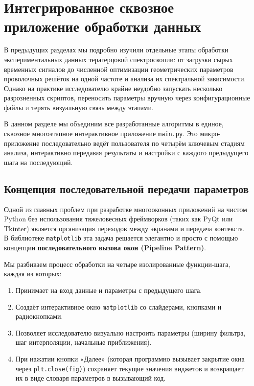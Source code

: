 
\section{Интегрированное сквозное приложение обработки данных} \label{sec:integrated_app}

В предыдущих разделах мы подробно изучили отдельные этапы обработки экспериментальных данных терагерцовой спектроскопии: от загрузки сырых временных сигналов до численной оптимизации геометрических параметров проволочных решёток на одной частоте и анализа их спектральной зависимости. Однако на практике исследователю крайне неудобно запускать несколько разрозненных скриптов, переносить параметры вручную через конфигурационные файлы и терять визуальную связь между этапами.

В данном разделе мы объединим все разработанные алгоритмы в единое, сквозное многоэтапное интерактивное приложение \texttt{main.py}. Это микро-приложение последовательно ведёт пользователя по четырём ключевым стадиям анализа, интерактивно передавая результаты и настройки с каждого предыдущего шага на последующий.

\subsection{Концепция последовательной передачи параметров}

Одной из главных проблем при разработке многооконных приложений на чистом Python без использования тяжеловесных фреймворков (таких как PyQt или Tkinter) является организация переходов между экранами и передача контекста. В библиотеке \texttt{matplotlib} эта задача решается элегантно и просто с помощью концепции \textbf{последовательного вызова окон (Pipeline Pattern)}.

Мы разбиваем процесс обработки на четыре изолированные функции-шага, каждая из которых:
\begin{enumerate}
    \item Принимает на вход данные и параметры с предыдущего шага.
    \item Создаёт интерактивное окно \texttt{matplotlib} со слайдерами, кнопками и радиокнопками.
    \item Позволяет исследователю визуально настроить параметры (ширину фильтра, шаг интерполяции, начальные приближения).
    \item При нажатии кнопки «Далее» (которая программно вызывает закрытие окна через \texttt{plt.close(fig)}) сохраняет текущие значения виджетов и возвращает их в виде словаря параметров в вызывающий код.
\end{enumerate}

